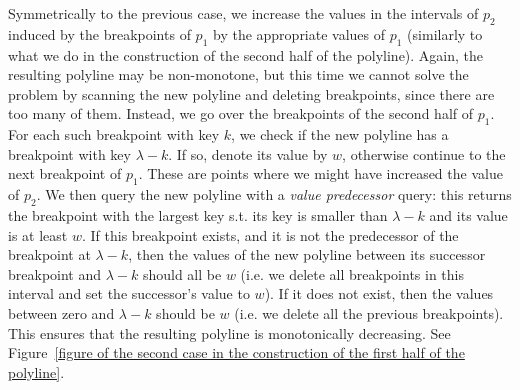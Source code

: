 \documentclass[11pt,a4paper]{article}
\theoremstyle{definition}
\theoremstyle{remark}
\begin{document}
\vspace{0.04in} 
Symmetrically to the previous case, we increase the values in the intervals of $p_2$ induced by the breakpoints of $p_1$ by the appropriate values of $p_{1}$ (similarly to what we do in the construction of the second half of the polyline). Again, the resulting polyline may be non-monotone, but this time we cannot solve the problem by scanning the new polyline and deleting breakpoints, since there are too many of them. Instead, we go over the breakpoints of the second half of $p_1$. For each such breakpoint  with key $k$, we check if the new polyline has a breakpoint with key $\lambda - k$. If so, denote its value by $w$, otherwise continue to the next breakpoint of $p_1$. These are points where we might have increased the value of $p_2$. We then query the new polyline with a \emph{value predecessor} query: this returns the breakpoint with the largest key s.t. its key is smaller than $\lambda - k$ and its value is at least $w$. 
%
If this breakpoint exists, and it is not the predecessor of the breakpoint at $\lambda - k$, then the values of the new polyline between its successor breakpoint and $\lambda - k$ should all be $w$ (i.e. we delete all breakpoints in this interval and set the successor's value to $w$). If it does not exist, then the values between zero and $\lambda - k$ should be $w$ (i.e. we delete all the previous breakpoints). 
This ensures that the resulting polyline is monotonically decreasing. 
See  Figure~\ref{figure of the second case in the construction of the first half of the polyline}.
\end{document}
